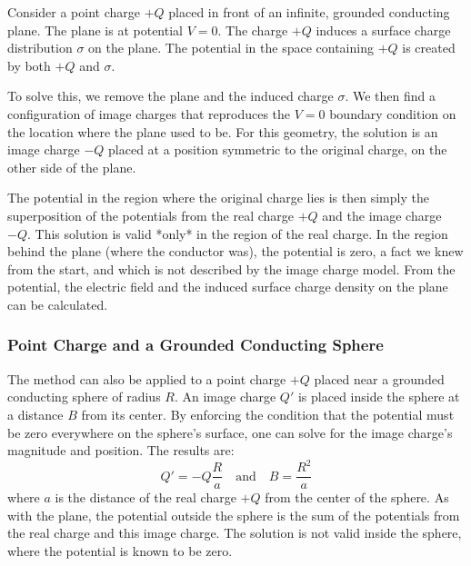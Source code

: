 Consider a point charge $+Q$ placed in front of an infinite, grounded conducting plane. The plane is at potential $V=0$. The charge $+Q$ induces a surface charge distribution $\sigma$ on the plane. The potential in the space containing $+Q$ is created by both $+Q$ and $\sigma$.

To solve this, we remove the plane and the induced charge $\sigma$. We then find a configuration of image charges that reproduces the $V=0$ boundary condition on the location where the plane used to be. For this geometry, the solution is an image charge $-Q$ placed at a position symmetric to the original charge, on the other side of the plane.

The potential in the region where the original charge lies is then simply the superposition of the potentials from the real charge $+Q$ and the image charge $-Q$. This solution is valid *only* in the region of the real charge. In the region behind the plane (where the conductor was), the potential is zero, a fact we knew from the start, and which is not described by the image charge model. From the potential, the electric field and the induced surface charge density on the plane can be calculated.

\subsubsection{Point Charge and a Grounded Conducting Sphere}

The method can also be applied to a point charge $+Q$ placed near a grounded conducting sphere of radius $R$. An image charge $Q'$ is placed inside the sphere at a distance $B$ from its center. By enforcing the condition that the potential must be zero everywhere on the sphere's surface, one can solve for the image charge's magnitude and position. The results are:
\begin{equation*}
 Q' = -Q \frac{R}{a} \quad \text{and} \quad B = \frac{R^2}{a}
\end{equation*}
where $a$ is the distance of the real charge $+Q$ from the center of the sphere. As with the plane, the potential outside the sphere is the sum of the potentials from the real charge and this image charge. The solution is not valid inside the sphere, where the potential is known to be zero.
